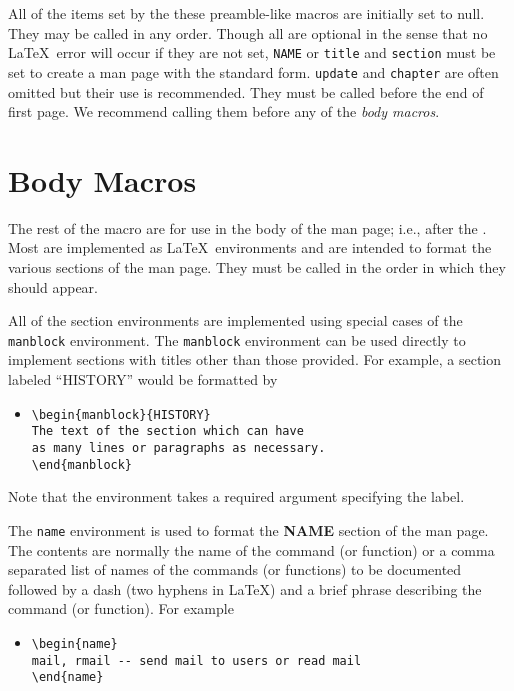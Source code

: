 All of the items set by the these preamble-like macros are initially
set to null. 
They may be called in any order.
Though all are optional in the sense that no \LaTeX\ error will occur
if they are not set, {\tt NAME} or {\tt title} and {\tt section} must
be set to create a man page with the standard form.  {\tt update} and
{\tt chapter} are often omitted but their use is recommended.  They
must be called before the end of first page.  We recommend calling
them before any of the {\it body macros}.

\section{Body Macros}

The rest of the macro are for use in the body of the man page; i.e.,
after the \verb||.  Most are implemented as \LaTeX\
environments and are intended to format the various sections of the
man page.  They must be called in the order in which they should
appear.    

All of the section environments are implemented using special cases of
the {\tt manblock} environment.  The {\tt manblock} environment can be
used directly to implement sections with titles other than those
provided.  For example, a section labeled ``HISTORY'' would be
formatted by
  \begin{itemize}
    \item[]
          \verb|\begin{manblock}{HISTORY}|\\
          \verb|The text of the section which can have|\\
          \verb|as many lines or paragraphs as necessary.|\\
          \verb|\end{manblock}|
  \end{itemize}
Note that the environment takes a required argument specifying the
label. 

The {\tt name} environment is used to format the {\bf NAME} section of
the man page.  The contents are normally the name of the command (or
function) or a comma separated list of names of the commands (or
functions) to be documented followed by a dash (two hyphens in \LaTeX)
and a brief phrase describing the command (or function).  For example
  \begin{itemize}
    \item[]
          \verb|\begin{name}|\\
          \verb|mail, rmail -- send mail to users or read mail|\\
          \verb|\end{name}|
  \end{itemize}

